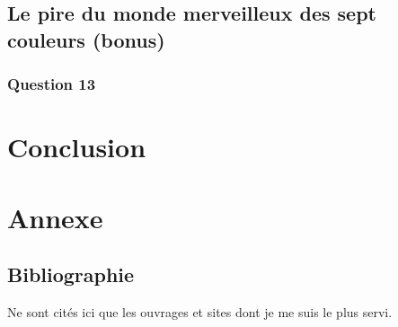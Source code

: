 \documentclass[12pt,a4paper,twoside]{article}
\begin{document}
\subsection{Le pire du monde merveilleux des sept couleurs (bonus)}
\label{sec:orgheadline24}
\subsubsection*{Question 13}
\label{sec:orgheadline23}
\section{Conclusion}
\label{sec:orgheadline26}
\label{sec:conclusion}

\clearpage\appendix

\section{Annexe}
\label{sec:orgheadline28}
\subsection{Bibliographie}
\label{sec:orgheadline27}
Ne sont cités ici que les ouvrages et sites dont je me suis le plus
servi.

\def\section*#1{}

\nocite{*}

\clearpage
\end{document}
